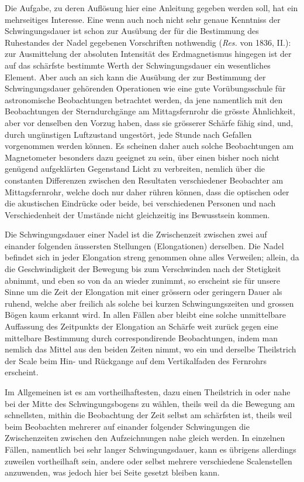 Die Aufgabe, zu deren Auflösung hier eine Anleitung gegeben werden soll, hat ein mehrseitiges Interesse. Eine wenn auch noch nicht sehr genaue Kenntniss der Schwingungsdauer ist schon zur Ausübung der für die Bestimmung des Ruhestandes der Nadel gegebenen Vorschriften nothwendig (\textit{Res.} von 1836, II.): zur Ausmittelung der absoluten Intensität des Erdmagnetismus hingegen ist der auf das schärfste bestimmte Werth der Schwingungsdauer ein wesentliches Element. Aber auch an sich kann die Ausübung der zur Bestimmung der Schwingungsdauer gehörenden Operationen wie eine gute Vorübungsschule für astronomische Beobachtungen betrachtet werden, da jene namentlich mit den Beobachtungen der Sterndurchgänge am Mittagsfernrohr die grösste Ähnlichkeit, aber vor denselben den Vorzug haben, dass sie grösserer Schärfe fähig sind, und, durch ungünstigen Luftzustand ungestört, jede Stunde nach Gefallen vorgenommen werden können. Es scheinen daher auch solche Beobachtungen am Magnetometer besonders dazu geeignet zu sein, über einen bisher noch nicht genügend aufgeklärten Gegenstand Licht zu verbreiten, nemlich über die constanten Differenzen zwischen den Resultaten verschiedener Beobachter am Mittagsfernrohr, welche doch nur daher rühren können, dass die optischen oder die akustischen Eindrücke oder beide, bei verschiedenen Personen und nach Verschiedenheit der Umstände nicht gleichzeitig ins Bewusstsein kommen.

Die Schwingungsdauer einer Nadel ist die Zwischenzeit zwischen zwei auf einander folgenden äussersten Stellungen (Elongationen) derselben. Die Nadel
befindet sich in jeder Elongation streng genommen ohne alles Verweilen; allein, da die Geschwindigkeit der Bewegung bis zum Verschwinden nach der Stetigkeit abnimmt, und eben so von da an wieder zunimmt, so erscheint sie für unsere Sinne um die Zeit der Elongation mit einer grössern oder geringern Dauer als ruhend, welche aber freilich als solche bei kurzen Schwingungszeiten und grossen Bögen kaum erkannt wird. In allen Fällen aber bleibt eine solche unmittelbare Auffassung des Zeitpunkts der Elongation an Schärfe weit zurück gegen eine mittelbare Bestimmung durch correspondirende Beobachtungen, indem man nemlich das Mittel aus den beiden Zeiten nimmt, wo ein und derselbe Theilstrich der Scale beim Hin- und Rückgange auf dem Vertikalfaden des Fernrohrs erscheint.

Im Allgemeinen ist es am vortheilhaftesten, dazu einen Theilstrich in oder nahe bei der Mitte des Schwingungsbogens zu wählen, theils weil da die Bewegung am schnellsten, mithin die Beobachtung der Zeit selbst am schärfsten ist, theils weil beim Beobachten mehrerer auf einander folgender Schwingungen die Zwischenzeiten zwischen den Aufzeichnungen nahe gleich werden. In einzelnen Fällen, namentlich bei sehr langer Schwingungsdauer, kann es übrigens allerdings zuweilen vortheilhaft sein, andere oder selbst mehrere verschiedene Scalenstellen anzuwenden, was jedoch hier bei Seite gesetzt bleiben kann.

